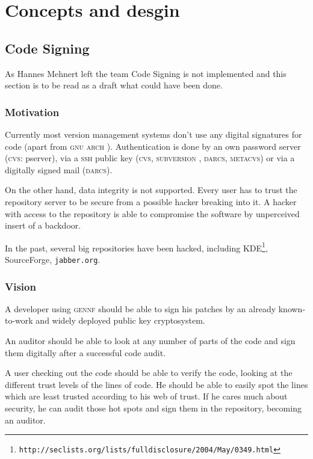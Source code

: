\documentclass[fleqn, 10pt, a4paper]{report} \usepackage{amssymb}
\begin{document}
\chapter{Concepts and desgin}

\section{Code Signing \label{codesigning}}

As Hannes Mehnert left the team Code Signing is not implemented and
this section is to be read as a draft what could have been done.


\subsection{Motivation}

Currently most version management systems don't use any digital
signatures for code (apart from \textsc{gnu arch} \cite{Gnua06}).
Authentication is done
by an own password server (\textsc{cvs}: pserver), via a \textsc{ssh} public
key (\textsc{cvs}, \textsc{subversion} \cite{Subv06}, \textsc{darcs},
\textsc{metacvs}) or via a digitally signed mail (\textsc{darcs}).

On the other hand, data integrity is not supported.  Every user has to
trust the repository server to be secure from a possible hacker
breaking into it.  A hacker with access to the repository is able to
compromise the software by unperceived insert of a backdoor.

In the past, several big repositories have been hacked, including
KDE\footnote{
  \texttt{http://seclists.org/lists/fulldisclosure/2004/May/0349.html}},
SourceForge, \texttt{jabber.org}.


\subsection{Vision}

A developer using \textsc{gennf} should be able to sign his patches
by an already known-to-work and widely deployed public key
cryptosystem.

An auditor should be able to look at any number of parts of the code
and sign them digitally after a successful code audit.

A user checking out the code should be able to verify the code,
looking at the different trust levels of the lines of code. He should
be able to easily spot the lines which are least trusted according to
his web of trust. If he cares much about security, he can audit those
hot spots and sign them in the repository, becoming an auditor.
\end{document}
